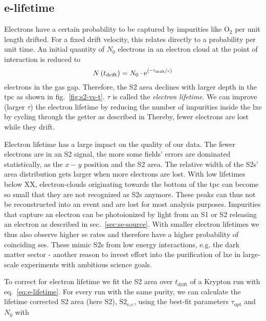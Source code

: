 
\FloatBarrier
\subsection{e-lifetime}
\label{ssec:e-lifetime}
\FloatBarrier


Electrons have a certain probability to be captured by impurities like $ \mathrm{O}_2 $ per unit length drifted.
For a fixed drift velocity, this relates directly to a probability per unit time.
An initial quantity of $ N_0 $ electrons in an electron cloud at the point of interaction is reduced to
\begin{equation}
    N \left( t_\mathrm{drift} \right) = N_0 \cdot \mathrm{e}^{ \left( \nicefrac{-t_\mathrm{drift}}{\tau} \right)}
    \label{eq:e-lifetime}
\end{equation}
electrons in the gas gap.
Therefore, the S2 area declines with larger depth in the \gls{tpc} as shown in fig.~\ref{fig:s2-vs-t}.
$ \tau $ is called the \emph{electron lifetime}.
We can improve (larger $ \tau $) the electron lifetime by reducing the number of impurities inside the \gls{lxe} by cycling through the getter as described in %
Thereby, fewer electrons are lost while they drift.

Electron lifetime has a large impact on the quality of our data.
The fewer electrons are in an S2 signal, the more some fields' errors are dominated statistically, as the $ x-y$ position and the S2 area.
The relative width of the S2s' area distribution gets larger when more electrons are lost.
With low lifetimes below XX, electron-clouds originating towards the bottom of the \gls{tpc} can become so small that they are not recognized as S2s anymore.  %
These peaks can thus not be reconstructed into an event and are lost for most analysis purposes.
Impurities that capture an electron can be photoionized by light from an S1 or S2 releasing an electron as described in sec.~\ref{sec:se-source}.  %
With smaller electron lifetimes we thus also observe higher \gls{se} rates and therefore have a higher probability of coinciding \glspl{se}.
These mimic S2s from low energy interactions, e.g. the dark matter sector - another reason to invest effort into the purification of \gls{lxe} in large-scale experiments with ambitious science goals.

To correct for electron lifetime we fit the S2 area over $ t_\mathrm{drift} $ of a Krypton run with eq.~\ref{eq:e-lifetime}.
For every run with the same purity, we can calculate the lifetime corrected S2 area (here S2), $ \mathrm{S2_\mathrm{e_\tau c}} $, using the best-fit parameters $ \tau_\mathrm{opt} $ and $ N_0 $ with

